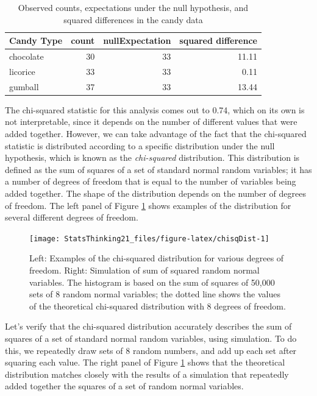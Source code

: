 \documentclass[12pt,]{book}
\theoremstyle{definition}
\theoremstyle{definition}
\theoremstyle{definition}
\theoremstyle{remark}
\begin{document}
\begin{table}

\caption{\label{tab:candyDf}Observed counts, expectations under the null hypothesis, and squared differences in the candy data}
\centering
\begin{tabular}[t]{l|r|r|r}
\hline
Candy Type & count & nullExpectation & squared difference\\
\hline
chocolate & 30 & 33 & 11.11\\
\hline
licorice & 33 & 33 & 0.11\\
\hline
gumball & 37 & 33 & 13.44\\
\hline
\end{tabular}
\end{table}

The chi-squared statistic for this analysis comes out to 0.74, which on its own is not interpretable, since it depends on the number of different values that were added together. However, we can take advantage of the fact that the chi-squared statistic is distributed according to a specific distribution under the null hypothesis, which is known as the \emph{chi-squared} distribution. This distribution is defined as the sum of squares of a set of standard normal random variables; it has a number of degrees of freedom that is equal to the number of variables being added together. The shape of the distribution depends on the number of degrees of freedom. The left panel of Figure \ref{fig:chisqDist} shows examples of the distribution for several different degrees of freedom.

\begin{figure}
\texttt{[image: StatsThinking21\_files/figure-latex/chisqDist-1]} \caption{Left: Examples of the chi-squared distribution for various degrees of freedom.  Right: Simulation of sum of squared random normal variables.   The histogram is based on the sum of squares of 50,000 sets of 8 random normal variables; the dotted line shows the values of the theoretical chi-squared distribution with 8 degrees of freedom.}\label{fig:chisqDist}
\end{figure}

Let's verify that the chi-squared distribution accurately describes the sum of squares of a set of standard normal random variables, using simulation. To do this, we repeatedly draw sets of 8 random numbers, and add up each set after squaring each value. The right panel of Figure \ref{fig:chisqDist} shows that the theoretical distribution matches closely with the results of a simulation that repeatedly added together the squares of a set of random normal variables.
\end{document}
